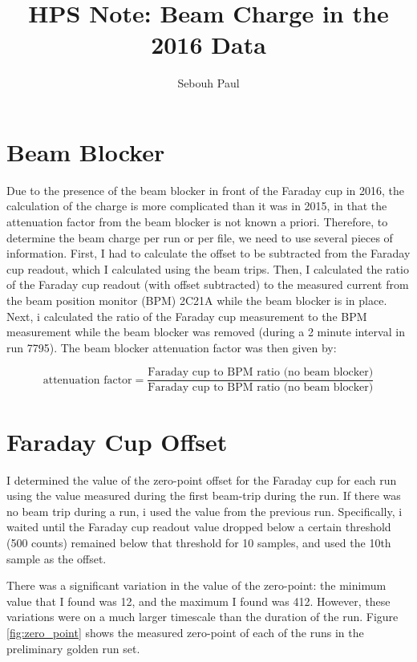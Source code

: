 \documentclass[11pt]{article}
\title{HPS Note:  Beam Charge in the 2016 Data}
\author{Sebouh Paul}
\date{}                                           %
\begin{document}
\maketitle

\section{Beam Blocker}
Due to the presence of the beam blocker in front of the Faraday cup in 2016, the calculation of the charge is more complicated than it was in 2015, in that the attenuation factor from the beam blocker is not known a priori.  Therefore, to determine the beam charge per run or per file, we need to use several pieces of information.  First, I had to calculate the offset to be subtracted from the Faraday cup readout, which I calculated using the beam trips.  Then, I calculated the ratio of the Faraday cup readout (with offset subtracted) to the measured current from the beam position monitor (BPM) 2C21A while the beam blocker is in place.  Next, i calculated the ratio of the Faraday cup measurement to the BPM measurement while the beam blocker was removed (during a 2 minute interval in run 7795).  The beam blocker attenuation factor was then given by:

\begin{equation}\label{eq:attenuation}
\textrm{attenuation factor} = \frac{\textrm{Faraday cup to BPM ratio (no beam blocker)}}{\textrm{Faraday cup to BPM ratio (no beam blocker)}}
\end{equation}

\section{Faraday Cup Offset}
I determined the value of the zero-point offset for the Faraday cup for each run using the value measured during the first beam-trip during the run.  If there was no beam trip during a run, i used the value from the previous run.  Specifically, i waited until the Faraday cup readout value dropped below a certain threshold (500 counts) remained below that threshold for 10 samples, and used the 10th sample as the offset.  

There was a significant variation in the value of the zero-point: the minimum value that I found was 12, and the maximum I found was 412.  However, these variations were on a much larger timescale than the duration of the run.  
Figure \ref{fig:zero_point} shows the measured zero-point of each of the runs in the preliminary golden run set.  
\end{document}
